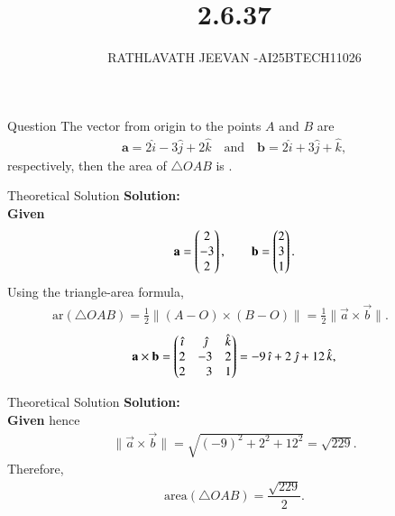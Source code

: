 \documentclass{beamer}
\title %
{2.6.37}
\author %
{RATHLAVATH JEEVAN -AI25BTECH11026}
\begin{document}
\frame{\titlepage}
\begin{frame}{Question}
The vector from origin to the points $A$ and $B$ are
\begin{align}
\mathbf{a} = 2\hat{i} - 3\hat{j} + 2\hat{k} 
\quad \text{and} \quad \mathbf{b} = 2\hat{i} + 3\hat{j} + \hat{k},
 \end{align}
 respectively, then the area of $\triangle OAB$ is \underline{\hspace{2cm}}.
 
\end{frame}
\begin{frame}{Theoretical Solution} 
\textbf{Solution:}\\
 \textbf{Given}  
\begin{align}
\mathbf a=\begin{pmatrix}2\\-3\\2\end{pmatrix},\qquad
\mathbf b=\begin{pmatrix}2\\3\\1\end{pmatrix}.
\end{align}
Using the triangle-area formula,
\begin{align}
\text{ar}(\triangle OAB)=\frac12\|(A-O)\times(B-O)\|
=\frac12\|\vec a\times\vec b\|. \; \; \; \; \; \; \; \;
 \end{align}
\begin{align}
\mathbf a\times\mathbf b=
\begin{pmatrix}
\hat{\imath}&\hat{\jmath}&\hat{k}\\
2&-3&2\\
2&\phantom{-}3&1
\end{pmatrix}
=-9\,\hat{\imath}+2\,\hat{\jmath}+12\,\hat{k},
 \end{align}
 \end{frame}
 \begin{frame}{Theoretical Solution} 
\textbf{Solution:}\\
 \textbf{Given} 
hence
\begin{align}
\|\vec a\times\vec b\|=\sqrt{(-9)^2+2^2+12^2}=\sqrt{229}.
\end{align}
Therefore,
\begin{align}
\boxed{\text{area}(\triangle OAB)=\dfrac{\sqrt{229}}{2}}.
\end{align}

\end{frame}
\end{document}
